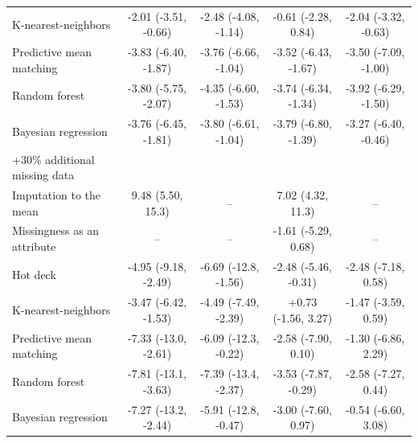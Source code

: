 \documentclass{article}
\begin{document}
\begin{table}
\begin{tabular}{lcccc}
K-nearest-neighbors & -2.01 (-3.51, -0.66) & -2.48 (-4.08, -1.14) & -0.61 (-2.28, 0.84) & -2.04 (-3.32, -0.63) \\ 
Predictive mean matching & -3.83 (-6.40, -1.87) & -3.76 (-6.66, -1.04) & -3.52 (-6.43, -1.67) & -3.50 (-7.09, -1.00) \\ 
Random forest & -3.80 (-5.75, -2.07) & -4.35 (-6.60, -1.53) & -3.74 (-6.34, -1.34) & -3.92 (-6.29, -1.50) \\ 
Bayesian regression & -3.76 (-6.45, -1.81) & -3.80 (-6.61, -1.04) & -3.79 (-6.80, -1.39) & -3.27 (-6.40, -0.46) \\ 
\midrule
\multicolumn{1}{l}{+30\% additional missing data} \\ 
\midrule
Imputation to the mean & 9.48 (5.50, 15.3) & -- & 7.02 (4.32, 11.3) & -- \\ 
Missingness as an attribute & -- & -- & -1.61 (-5.29, 0.68) & -- \\ 
Hot deck & -4.95 (-9.18, -2.49) & -6.69 (-12.8, -1.56) & -2.48 (-5.46, -0.31) & -2.48 (-7.18, 0.58) \\ 
K-nearest-neighbors & -3.47 (-6.42, -1.53) & -4.49 (-7.49, -2.39) & +0.73 (-1.56, 3.27) & -1.47 (-3.59, 0.59) \\ 
Predictive mean matching & -7.33 (-13.0, -2.61) & -6.09 (-12.3, -0.22) & -2.58 (-7.90, 0.10) & -1.30 (-6.86, 2.29) \\ 
Random forest & -7.81 (-13.1, -3.63) & -7.39 (-13.4, -2.37) & -3.53 (-7.87, -0.29) & -2.58 (-7.27, 0.44) \\ 
Bayesian regression & -7.27 (-13.2, -2.44) & -5.91 (-12.8, -0.47) & -3.00 (-7.60, 0.97) & -0.54 (-6.60, 3.08) \\ 
\bottomrule
\end{tabular} 
 \end{table}

\clearpage
\end{document}
